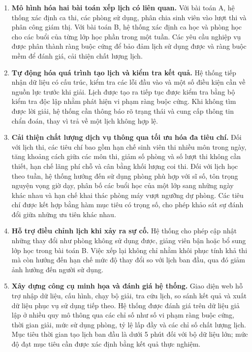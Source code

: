 \begin{enumerate}
    \item \textbf{Mô hình hóa hai bài toán xếp lịch có liên quan.} Với bài toán A, hệ thống xác định ca thi, các phòng sử dụng, phân chia sinh viên vào lượt thi và phân công giám thị. Với bài toán B, hệ thống xác định ca học và phòng học cho các buổi của từng lớp học phần trong một tuần. Các yêu cầu nghiệp vụ được phân thành ràng buộc cứng để bảo đảm lịch sử dụng được và ràng buộc mềm để đánh giá, cải thiện chất lượng lịch.

    \item \textbf{Tự động hóa quá trình tạo lịch và kiểm tra kết quả.} Hệ thống tiếp nhận dữ liệu có cấu trúc, kiểm tra các lỗi đầu vào và một số điều kiện cần về nguồn lực trước khi giải. Lịch được tạo ra tiếp tục được kiểm tra bằng bộ kiểm tra độc lập nhằm phát hiện vi phạm ràng buộc cứng. Khi không tìm được lời giải, hệ thống cần thông báo rõ trạng thái và cung cấp thông tin chẩn đoán, thay vì trả về một lịch không hợp lệ.

    \item \textbf{Cải thiện chất lượng dịch vụ thông qua tối ưu hóa đa tiêu chí.} Đối với lịch thi, các tiêu chí bao gồm hạn chế sinh viên thi nhiều môn trong ngày, tăng khoảng cách giữa các môn thi, giảm số phòng và số lượt thi không cần thiết, hạn chế lãng phí chỗ và cân bằng khối lượng coi thi. Đối với lịch học theo tuần, hệ thống hướng đến sử dụng phòng phù hợp với sĩ số, tôn trọng nguyện vọng giờ dạy, phân bố các buổi học của một lớp sang những ngày khác nhau và hạn chế khai thác phòng máy vượt ngưỡng dự phòng. Các tiêu chí được kết hợp bằng hàm mục tiêu có trọng số, cho phép khảo sát sự đánh đổi giữa những ưu tiên khác nhau.

    \item \textbf{Hỗ trợ điều chỉnh lịch khi xảy ra sự cố.} Hệ thống cho phép cập nhật những thay đổi như phòng không sử dụng được, giảng viên bận hoặc bổ sung lớp học trong bài toán B. Việc xếp lại không chỉ nhằm khôi phục tính khả thi mà còn hướng đến hạn chế mức độ thay đổi so với lịch ban đầu, qua đó giảm ảnh hưởng đến người sử dụng.

    \item \textbf{Xây dựng công cụ minh họa và đánh giá hệ thống.} Giao diện web hỗ trợ nhập dữ liệu, cấu hình, chạy bộ giải, tra cứu lịch, so sánh kết quả và xuất dữ liệu phục vụ sử dụng tiếp theo. Hệ thống được đánh giá trên dữ liệu giả lập ở nhiều quy mô thông qua các chỉ số như số vi phạm ràng buộc cứng, thời gian giải, mức sử dụng phòng, tỷ lệ lấp đầy và các chỉ số chất lượng lịch. Mục tiêu thời gian tạo lịch ban đầu là dưới 5 phút đối với bộ dữ liệu lớn; mức độ đạt mục tiêu cần được xác định bằng kết quả thực nghiệm.
\end{enumerate}

